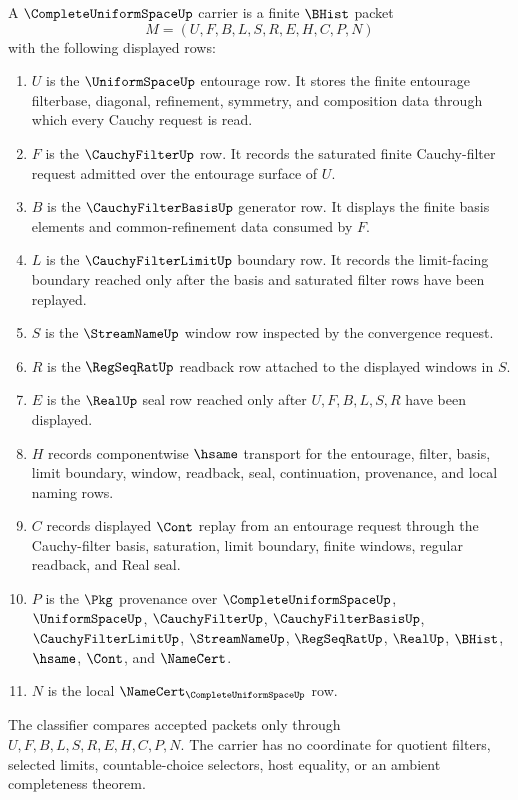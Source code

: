 \begin{definition}
\label{def:complete-uniform-space-carrier}
A $\CompleteUniformSpaceUp$ carrier is a finite $\BHist$ packet
$$
M=(U,F,B,L,S,R,E,H,C,P,N)
$$
with the following displayed rows:
\begin{enumerate}
\item $U$ is the $\UniformSpaceUp$ entourage row. It stores the finite entourage filterbase, diagonal, refinement, symmetry, and composition data through which every Cauchy request is read.
\item $F$ is the $\CauchyFilterUp$ row. It records the saturated finite Cauchy-filter request admitted over the entourage surface of $U$.
\item $B$ is the $\CauchyFilterBasisUp$ generator row. It displays the finite basis elements and common-refinement data consumed by $F$.
\item $L$ is the $\CauchyFilterLimitUp$ boundary row. It records the limit-facing boundary reached only after the basis and saturated filter rows have been replayed.
\item $S$ is the $\StreamNameUp$ window row inspected by the convergence request.
\item $R$ is the $\RegSeqRatUp$ readback row attached to the displayed windows in $S$.
\item $E$ is the $\RealUp$ seal row reached only after $U,F,B,L,S,R$ have been displayed.
\item $H$ records componentwise $\hsame$ transport for the entourage, filter, basis, limit boundary, window, readback, seal, continuation, provenance, and local naming rows.
\item $C$ records displayed $\Cont$ replay from an entourage request through the Cauchy-filter basis, saturation, limit boundary, finite windows, regular readback, and Real seal.
\item $P$ is the $\Pkg$ provenance over $\CompleteUniformSpaceUp$, $\UniformSpaceUp$, $\CauchyFilterUp$, $\CauchyFilterBasisUp$, $\CauchyFilterLimitUp$, $\StreamNameUp$, $\RegSeqRatUp$, $\RealUp$, $\BHist$, $\hsame$, $\Cont$, and $\NameCert$.
\item $N$ is the local $\NameCert_{\CompleteUniformSpaceUp}$ row.
\end{enumerate}
The classifier compares accepted packets only through $U,F,B,L,S,R,E,H,C,P,N$. The carrier has no coordinate for quotient filters, selected limits, countable-choice selectors, host equality, or an ambient completeness theorem.
\end{definition}

